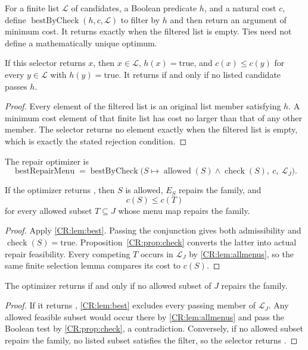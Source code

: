 For a finite list $\mathcal L$ of candidates, a Boolean predicate $h$, and a natural cost $c$, define $\operatorname{bestByCheck}(h,c,\mathcal L)$ to filter by $h$ and then return an argument of minimum cost. It returns  exactly when the filtered list is empty. Ties need not define a mathematically unique optimum.

\begin{CRlemma}\label{CR:lem:best}
If this selector returns $x$, then $x\in\mathcal L$, $h(x)=\mathrm{true}$, and $c(x)\leq c(y)$ for every $y\in\mathcal L$ with $h(y)=\mathrm{true}$. It returns  if and only if no listed candidate passes $h$.
\end{CRlemma}
\begin{proof}
Every element of the filtered list is an original list member satisfying $h$. A minimum cost element of that finite list has cost no larger than that of any other member. The selector returns no element exactly when the filtered list is empty, which is exactly the stated rejection condition.
\end{proof}

The repair optimizer is
\[
\operatorname{bestRepairMenu}
=\operatorname{bestByCheck}\bigl(
S\mapsto\operatorname{allowed}(S)\wedge\operatorname{check}(S),\ c,\ \mathcal L_J\bigr).
\]

\begin{CRtheorem}\label{CR:thm:optimizer}
If the optimizer returns , then $S$ is allowed, $E_S$ repairs the family, and
\[
c(S)\leq c(T)
\]
for every allowed subset $T\subseteq J$ whose menu map repairs the family.
\end{CRtheorem}
\begin{proof}
Apply \cref{CR:lem:best}. Passing the conjunction gives both admissibility and $\operatorname{check}(S)=\mathrm{true}$. Proposition~\ref{CR:prop:check} converts the latter into actual repair feasibility. Every competing $T$ occurs in $\mathcal L_J$ by \cref{CR:lem:allmenus}, so the same finite selection lemma compares its cost to $c(S)$.
\end{proof}

\begin{CRtheorem}\label{CR:thm:none}
The optimizer returns  if and only if no allowed subset of $J$ repairs the family.
\end{CRtheorem}
\begin{proof}
If it returns , \cref{CR:lem:best} excludes every passing member of $\mathcal L_J$. Any allowed feasible subset would occur there by \cref{CR:lem:allmenus} and pass the Boolean test by \cref{CR:prop:check}, a contradiction. Conversely, if no allowed subset repairs the family, no listed subset satisfies the filter, so the selector returns .
\end{proof}

